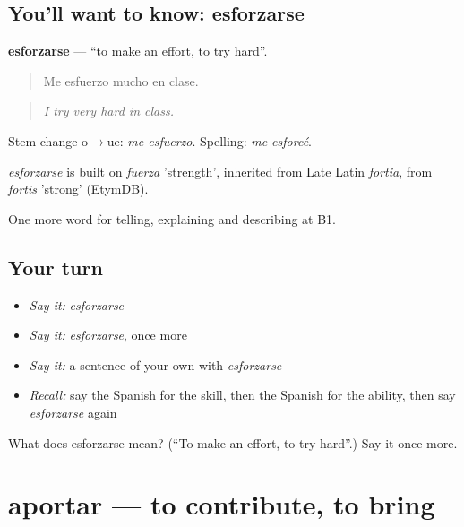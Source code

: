 \subsection*{You'll want to know: esforzarse}
\textbf{esforzarse} — \textquotedblleft{}to make an effort, to try hard\textquotedblright{}.

\begin{quote}
Me esfuerzo mucho en clase.
\end{quote}

\begin{quote}
\emph{I try very hard in class.}
\end{quote}

Stem change o$\to$ue: \emph{me esfuerzo}. Spelling: \emph{me esforcé}.

\begin{cousinweb}
\emph{esforzarse} is built on \emph{fuerza} 'strength', inherited from Late Latin \emph{fortia}, from \emph{fortis} 'strong' (EtymDB).
\end{cousinweb}

\begin{grammarlens}[title={What you've built}]
One more word for telling, explaining and describing at B1.
\end{grammarlens}

\subsection*{Your turn}
\begin{itemize}
\raggedright
  \item \emph{Say it:} \emph{esforzarse}
  \item \emph{Say it:} \emph{esforzarse}, once more
  \item \emph{Say it:} a sentence of your own with \emph{esforzarse}
  \item \emph{Recall:} say the Spanish for the skill, then the Spanish for the ability, then say \emph{esforzarse} again
\end{itemize}

\begin{tcolorbox}[breakable,colback=teal!4,colframe=teal!35!black,title={Before you move on}]
What does esforzarse mean? (\textquotedblleft{}To make an effort, to try hard\textquotedblright{}.) Say it once more.
\end{tcolorbox}
\section[aportar]{aportar — to contribute, to bring}

